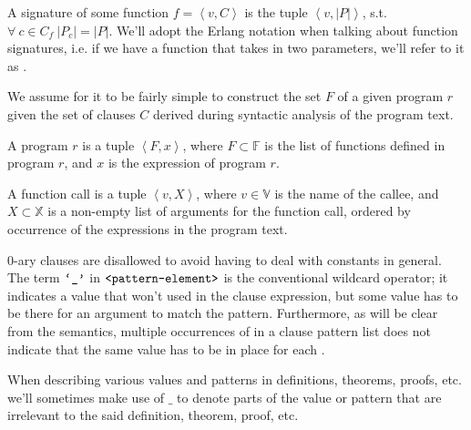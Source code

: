 \begin{definition} A signature of some function $f=\left\langle v, C
\right\rangle$ is the tuple $\left\langle v,|P| \right\rangle$, s.t.
$\forall\ c\in C_f\ |P_c|=|P|$. We'll adopt the Erlang notation when talking
about function signatures, i.e. if we have a function  that takes in
two parameters, we'll refer to it as .\end{definition}

We assume for it to be fairly simple to construct the set $F$ of a given
program $r$ given the set of clauses $C$ derived during syntactic analysis of
the program text.

\begin{definition} A program $r$ is a tuple $\left\langle F,x \right\rangle$,
where $F\subset\mathbb{F}$ is the list of functions defined in program $r$, and
$x$ is the expression of program $r$.\end{definition}

\begin{definition}\label{definition:function-call} A function call is a tuple
$\left\langle v, X \right\rangle$, where $v\in\mathbb{V}$ is the name of the
callee, and $X\subset\mathbb{X}$ is a non-empty list of arguments for the
function call, ordered by occurrence of the expressions in the program
text.\end{definition}

0-ary clauses are disallowed to avoid having to deal with constants in general.
The term $\text{{\ttfamily`\_'}}$ in $\text{{\ttfamily<pattern-element>}}$ is the conventional
wildcard operator; it indicates a value that won't used in the clause
expression, but some value has to be there for an argument to match the
pattern. Furthermore, as will be clear from the semantics, multiple occurrences
of \term{\_} in a clause pattern list does not indicate that the same value has
to be in place for each \term{\_}. 

\begin{definition} When describing various values and patterns in definitions,
theorems, proofs, etc. we'll sometimes make use of $\_$ to denote parts of the
value or pattern that are irrelevant to the said definition, theorem, proof,
etc.\end{definition}



